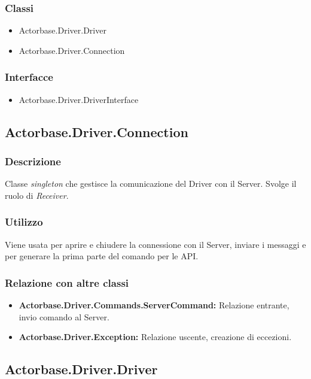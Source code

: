 \documentclass[a4paper]{article}
\begin{document}
		\subsubsection{Classi}
			\begin{itemize}
				\item Actorbase.Driver.Driver
				\item Actorbase.Driver.Connection
			\end{itemize}
			
		\subsubsection{Interfacce}
			\begin{itemize}
				\item Actorbase.Driver.DriverInterface
			\end{itemize}
		
		\subsection{Actorbase.Driver.Connection}
		
		\subsubsection{Descrizione}
			Classe \emph{singleton} che gestisce la comunicazione del Driver con il Server. Svolge il ruolo di \emph{Receiver}.
		\subsubsection{Utilizzo}
			Viene usata per aprire e chiudere la connessione con il Server, inviare i messaggi e per generare la prima parte del comando per le API.
		\subsubsection{Relazione con altre classi}
			\begin{itemize}
				\item \textbf{Actorbase.Driver.Commands.ServerCommand:} Relazione entrante, invio comando al Server.
				\item \textbf{Actorbase.Driver.Exception:} Relazione uscente, creazione di eccezioni.
			\end{itemize}
		
		\subsection{Actorbase.Driver.Driver}
		
\end{document}
